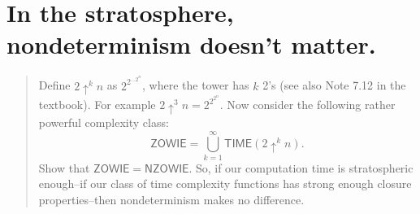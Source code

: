 

\maketitle
\thispagestyle{firststyle}
\vspace{-2.0cm}

\section*{In the stratosphere, nondeterminism doesn’t matter.}
    \begin{quote}
    Define $2\uparrow^k n$ as $2^{2^{...2^n}}$, where the tower has $k$ 2's (see also Note 7.12 in the textbook).
    For example $2 \uparrow^3 n = 2^{2^{2^n}}$.
    Now consider the following rather powerful complexity class:
    \[
        \mathsf{ZOWIE} =
        \bigcup_{k=1}^\infty \mathsf{TIME}(2\uparrow^k n).
    \]
    Show that $\mathsf{ZOWIE} = \mathsf{NZOWIE}$.
    So, if our computation time is stratospheric enough--if our class of time complexity functions has strong enough closure properties--then nondeterminism makes no difference.
    \end{quote}
